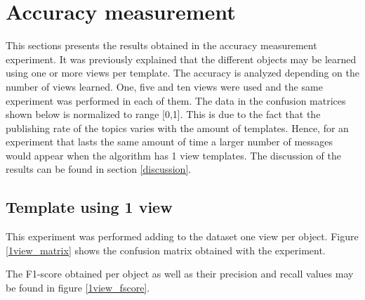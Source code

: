 \section{Accuracy measurement}
\label{results_accuracy_measurement}
This sections presents the results obtained in the accuracy measurement experiment. 
It was previously explained that the different objects may be learned using one or more views per template. 
The accuracy is analyzed depending on the number of views learned. 
One, five and ten views were used and the same experiment was performed in each of them. 
The data in the confusion matrices shown below is normalized to range [0,1].
This is due to the fact that the publishing rate of the topics varies with the amount of templates. 
Hence, for an experiment that lasts the same amount of time a larger number of messages would appear when the algorithm has 1 view templates. 
The discussion of the results can be found in section \ref{discussion}.

\subsection{Template using 1 view}
This experiment was performed adding to the dataset one view per object. 
Figure \ref{1view_matrix} shows the confusion matrix obtained with the experiment. 

The F1-score obtained per object as well as their precision and recall values may be found in figure \ref{1view_fscore}.





